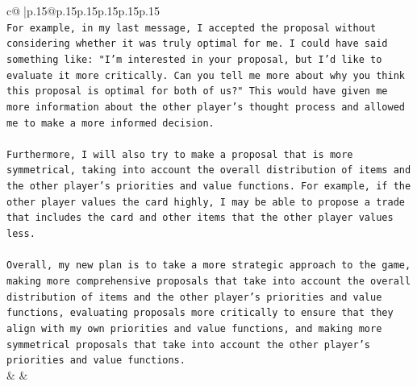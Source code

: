\documentclass{article}
\begin{document}
{\begin{supertabular}{c@{$\;$}|p{.15\linewidth}@{}p{.15\linewidth}p{.15\linewidth}p{.15\linewidth}p{.15\linewidth}p{.15\linewidth}}
{{{\\ 
\texttt{For example, in my last message, I accepted the proposal without considering whether it was truly optimal for me. I could have said something like: "I'm interested in your proposal, but I'd like to evaluate it more critically. Can you tell me more about why you think this proposal is optimal for both of us?" This would have given me more information about the other player's thought process and allowed me to make a more informed decision.} \\
\\ 
\texttt{Furthermore, I will also try to make a proposal that is more symmetrical, taking into account the overall distribution of items and the other player's priorities and value functions. For example, if the other player values the card highly, I may be able to propose a trade that includes the card and other items that the other player values less.} \\
\\ 
\texttt{Overall, my new plan is to take a more strategic approach to the game, making more comprehensive proposals that take into account the overall distribution of items and the other player's priorities and value functions, evaluating proposals more critically to ensure that they align with my own priorities and value functions, and making more symmetrical proposals that take into account the other player's priorities and value functions.} \\
            }
        }
    }
    & & \\ \\


\end{supertabular}}
\end{document}
